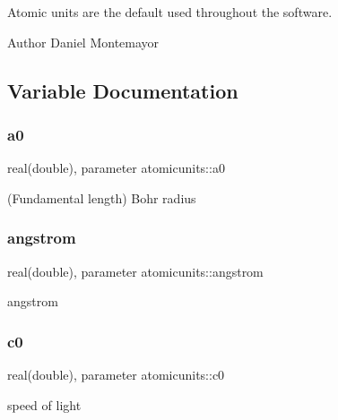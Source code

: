 Atomic units are the default used throughout the software. \begin{DoxyAuthor}{Author}
Daniel Montemayor 
\end{DoxyAuthor}


\subsection{Variable Documentation}
\mbox{\label{namespaceatomicunits_aa4859dbb9e7739ae603b78d9f2c58f93}} 
\subsubsection{\texorpdfstring{a0}{a0}}
{\footnotesize\ttfamily real(double), parameter atomicunits\+::a0}



(Fundamental length) Bohr radius 

\mbox{\label{namespaceatomicunits_a618f9dcd7de9b9ddb53af5bd4f1095c6}} 
\subsubsection{\texorpdfstring{angstrom}{angstrom}}
{\footnotesize\ttfamily real(double), parameter atomicunits\+::angstrom}



angstrom 

\mbox{\label{namespaceatomicunits_ae35b35bfa15b571da842371a32dcb2e6}} 
\subsubsection{\texorpdfstring{c0}{c0}}
{\footnotesize\ttfamily real(double), parameter atomicunits\+::c0}



speed of light 

\mbox{\label{namespaceatomicunits_af82c72bfababde1e5da6ac04a43b8570}} 
